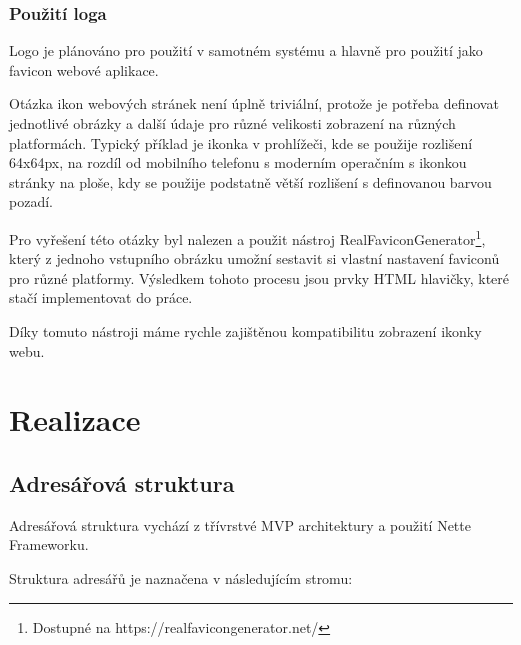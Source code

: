 \documentclass[czech,BP]{thesiskiv}
\begin{document}
	\subsection{Použití loga}
	\par Logo je plánováno pro použití v samotném systému a hlavně pro použití jako favicon webové aplikace.
	\par Otázka ikon webových stránek není úplně triviální, protože je potřeba definovat jednotlivé obrázky a další údaje pro různé velikosti zobrazení na různých platformách. Typický příklad je ikonka v prohlížeči, kde se použije rozlišení 64x64px, na rozdíl od mobilního telefonu s moderním operačním s ikonkou stránky na ploše, kdy se použije podstatně větší rozlišení s definovanou barvou pozadí.
	\par Pro vyřešení této otázky byl nalezen a použit nástroj RealFaviconGenerator\footnote{Dostupné na https://realfavicongenerator.net/}, který z jednoho vstupního obrázku umožní sestavit si vlastní nastavení faviconů pro různé platformy. Výsledkem tohoto procesu jsou prvky HTML hlavičky, které stačí implementovat do práce. 
	\par Díky tomuto nástroji máme rychle zajištěnou kompatibilitu zobrazení ikonky webu.
\chapter{Realizace}
	\section{Adresářová struktura}
	\par Adresářová struktura vychází z třívrstvé MVP architektury a  použití Nette Frameworku.
	\par Struktura adresářů je naznačena v následujícím stromu:
\end{document}

